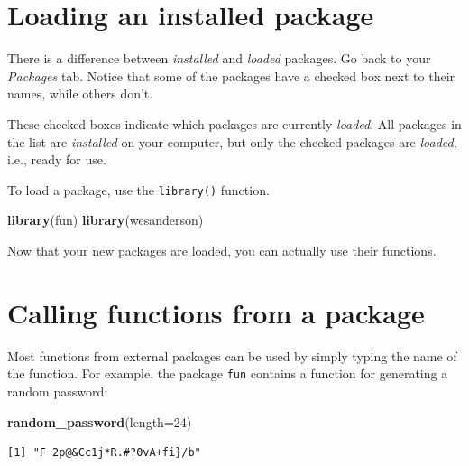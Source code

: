 \documentclass[
]{book}
\newenvironment{Shaded}{\begin{snugshade}}{\end{snugshade}}
\newcommand{\DataTypeTok}[1]{\textcolor[rgb]{0.13,0.29,0.53}{#1}}
\newcommand{\DecValTok}[1]{\textcolor[rgb]{0.00,0.00,0.81}{#1}}
\newcommand{\KeywordTok}[1]{\textcolor[rgb]{0.13,0.29,0.53}{\textbf{#1}}}
\newcommand{\NormalTok}[1]{#1}
\begin{document}
\hypertarget{loading-an-installed-package}{%
\section*{Loading an installed package}\label{loading-an-installed-package}}

There is a difference between \emph{installed} and \emph{loaded} packages. Go back to your \emph{Packages} tab. Notice that some of the packages have a checked box next to their names, while others don't.

These checked boxes indicate which packages are currently \emph{loaded}. All packages in the list are \emph{installed} on your computer, but only the checked packages are \emph{loaded}, i.e., ready for use.

To load a package, use the \texttt{library()} function.

\begin{Shaded}
\begin{Highlighting}[]
\KeywordTok{library}\NormalTok{(fun)}
\KeywordTok{library}\NormalTok{(wesanderson)}
\end{Highlighting}
\end{Shaded}

Now that your new packages are loaded, you can actually use their functions.

\hypertarget{calling-functions-from-a-package}{%
\section*{Calling functions from a package}\label{calling-functions-from-a-package}}

Most functions from external packages can be used by simply typing the name of the function. For example, the package \texttt{fun} contains a function for generating a random password:

\begin{Shaded}
\begin{Highlighting}[]
\KeywordTok{random_password}\NormalTok{(}\DataTypeTok{length=}\DecValTok{24}\NormalTok{)}
\end{Highlighting}
\end{Shaded}

\begin{verbatim}
[1] "F 2p@&Cc1j*R.#?0vA+fi}/b"
\end{verbatim}
\end{document}
